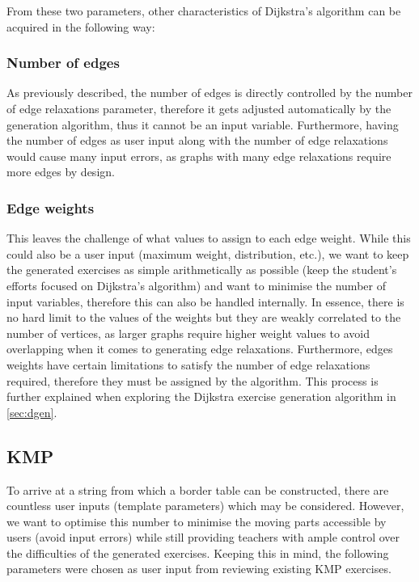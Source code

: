 \documentclass{l4proj}
\begin{document}
From these two parameters, other characteristics of Dijkstra's algorithm can be acquired in the following way:

\subsubsection{Number of edges}

As previously described, the number of edges is directly controlled by the number of edge relaxations parameter, therefore it gets adjusted automatically by the generation algorithm, thus it cannot be an input variable. Furthermore, having the number of edges as user input along with the number of edge relaxations would cause many input errors, as graphs with many edge relaxations require more edges by design. 

\subsubsection{Edge weights}

This leaves the challenge of what values to assign to each edge weight. While this could also be a user input (maximum weight, distribution, etc.), we want to keep the generated exercises as simple arithmetically as possible (keep the student's efforts focused on Dijkstra's algorithm) and want to minimise the number of input variables, therefore this can also be handled internally. In essence, there is no hard limit to the values of the weights but they are weakly correlated to the number of vertices, as larger graphs require higher weight values to avoid overlapping when it comes to generating edge relaxations. Furthermore, edges weights have certain limitations to satisfy the number of edge relaxations required, therefore they must be assigned by the algorithm. This process is further explained when exploring the Dijkstra exercise generation algorithm in \autoref{sec:dgen}. 

\subsection{KMP}

To arrive at a string from which a border table can be constructed, there are countless user inputs (template parameters) which may be considered. However, we want to optimise this number to minimise the moving parts accessible by users (avoid input errors) while still providing teachers with ample control over the difficulties of the generated exercises. Keeping this in mind, the following parameters were chosen as user input from reviewing existing KMP exercises.
\end{document}
